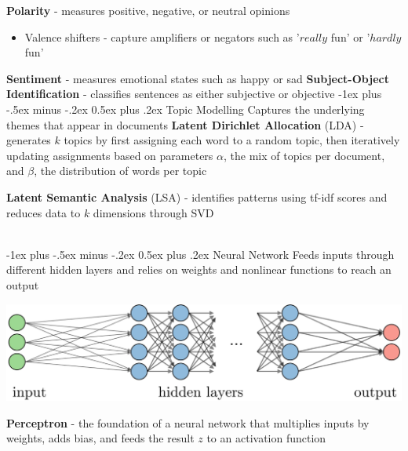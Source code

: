 \documentclass[10pt,landscape]{article}
\makeatletter
\renewcommand{\section}{\@startsection{section}{1}{0mm}%
                                {-1ex plus -.5ex minus -.2ex}%
                                {0.5ex plus .2ex}%
                                {\normalfont\large\bfseries}}
\renewcommand{\subsection}{\@startsection{subsection}{2}{0mm}%
                                {-1ex plus -.5ex minus -.2ex}%
                                {0.5ex plus .2ex}%
                                {\normalfont\normalsize\bfseries}}
\makeatother
\begin{document}
\begin{multicols}{3}
    \textbf{Polarity} - measures positive, negative, or neutral opinions
    \begin{itemize}[label={--},leftmargin=4mm]
        \itemsep -.4mm
        \item Valence shifters - capture amplifiers or negators such as '$really$ fun' or '$hardly$ fun'
    \end{itemize}
    \textbf{Sentiment} - measures emotional states such as happy or sad
    \textbf{Subject-Object Identification} - classifies sentences as either subjective or objective
    \subsection{Topic Modelling}
    Captures the underlying themes that appear in documents
    \textbf{Latent Dirichlet Allocation} (LDA) - generates $k$ topics by first assigning each word to a random topic, then iteratively updating assignments based on parameters $\alpha$, the mix of topics per document, and $\beta$, the distribution of words per topic

    \textbf{Latent Semantic Analysis} (LSA) - identifies patterns using tf-idf scores and reduces data to $k$ dimensions through SVD

    \textcolor{white}{.}\vspace{-5mm}\\ %
    \section{Neural Network}
    Feeds inputs through different hidden layers and relies on weights and nonlinear functions to reach an output
    \vspace{-1mm}
    \begin{center}
        \includegraphics[scale = .11]{images/nn3.JPG}
    \end{center}
    \vspace{-1mm}
    \textbf{Perceptron} - the foundation of a neural network that multiplies inputs by weights, adds bias, and feeds the result $z$ to an activation function


\end{multicols}
\end{document}
